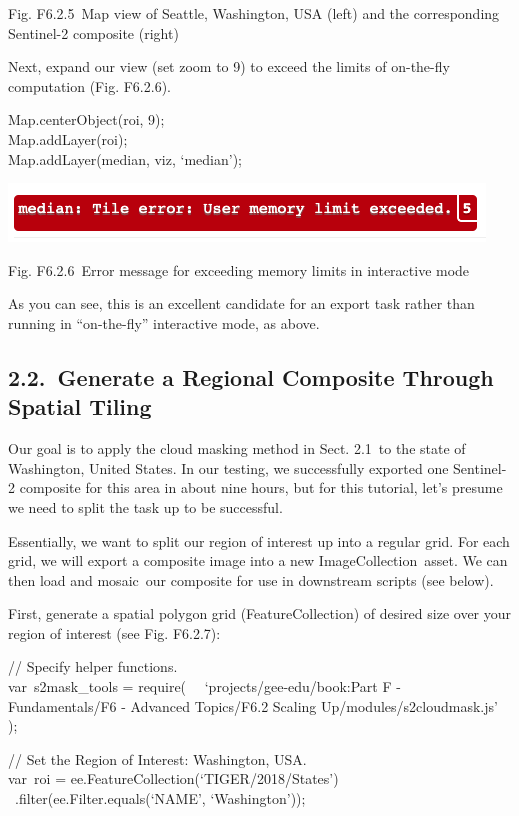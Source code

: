 \documentclass[
  letterpaper,
  DIV=11,
  numbers=noendperiod]{scrreprt}
\begin{document}
Fig. F6.2.5~Map view of Seattle, Washington, USA (left) and the
corresponding Sentinel-2 composite (right)

Next, expand our view (set zoom to 9) to exceed the limits of on-the-fly
computation (Fig. F6.2.6).

Map.centerObject(roi, 9);\\
Map.addLayer(roi);\\
Map.addLayer(median, viz, `median');

\includegraphics{./F6/image42.png}

Fig. F6.2.6~Error message for exceeding memory limits in interactive
mode

As you can see, this is an excellent candidate for an export task rather
than running in ``on-the-fly'' interactive mode, as above.

\hypertarget{generate-a-regional-composite-through-spatial-tiling}{%
\subsection{2.2.~Generate a Regional Composite Through Spatial
Tiling}\label{generate-a-regional-composite-through-spatial-tiling}}

Our goal is to apply the cloud masking method in Sect. 2.1~to the state
of Washington, United States. In our testing, we successfully exported
one Sentinel-2 composite for this area in about nine hours, but for this
tutorial, let's presume we need to split the task up to be successful.

Essentially, we want to split our region of interest up into a regular
grid. For each grid, we will export a composite image into a new
ImageCollection~asset. We can then load and mosaic~our composite for use
in downstream scripts (see below).

First, generate a spatial polygon grid (FeatureCollection) of desired
size over your region of interest (see Fig. F6.2.7):

// Specify helper functions.\\
var~s2mask\_tools = require(~ ~`projects/gee-edu/book:Part F -
Fundamentals/F6 - Advanced Topics/F6.2 Scaling
Up/modules/s2cloudmask.js'\\
);

// Set the Region of Interest: Washington, USA.\\
var~roi = ee.FeatureCollection(`TIGER/2018/States')\\
\hspace*{0.333em} ~.filter(ee.Filter.equals(`NAME', `Washington'));
\end{document}

